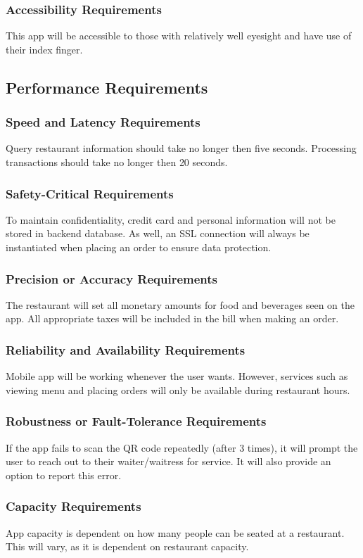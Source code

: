 \documentclass[12pt, titlepage]{article}
\begin{document}
\subsubsection{Accessibility Requirements}
This app will be accessible to those with relatively well eyesight and have use of their index finger. 
 
\subsection{Performance Requirements}

\subsubsection{Speed and Latency Requirements}
Query restaurant information should take no longer then five seconds. Processing transactions should take no longer then 20 seconds.  

\subsubsection{Safety-Critical Requirements}
To maintain confidentiality, credit card and personal information will not be stored in backend database. As well, an SSL connection will always be instantiated when placing an order to ensure data protection. 
\subsubsection{Precision or Accuracy Requirements}
The restaurant will set all monetary amounts for food and beverages seen on the app. All appropriate taxes will be included in the bill when making an order.  
\subsubsection{Reliability and Availability Requirements}
Mobile app will be working whenever the user wants. However, services such as viewing menu and placing orders will only be available during restaurant hours.
\subsubsection{Robustness or Fault-Tolerance Requirements}
If the app fails to scan the QR code repeatedly (after 3 times), it will prompt the user to reach out to their waiter/waitress for service. It will also provide an option to report this error.
\subsubsection{Capacity Requirements}
App capacity is dependent on how many people can be seated at a restaurant. This will vary, as it is dependent on restaurant capacity. 
\end{document}
